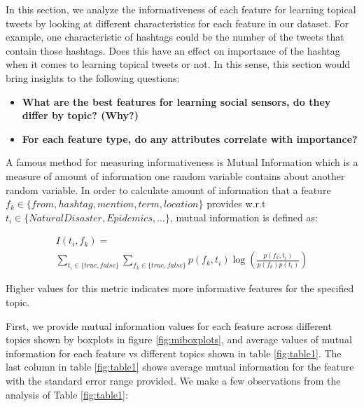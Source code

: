 In this section, we analyze the informativeness of each feature for learning topical tweets by looking at different characteristics for each feature in our dataset. For example, one characteristic of hashtags could be the number of the tweets that contain those hashtags. Does this have an effect on importance of the hashtag when it comes to learning topical tweets or not. In this sense, this section would bring insights to the following questions:

\begin{itemize}
\item \textbf{What are the best features for learning social sensors, do they differ by topic?  (Why?)}
\item \textbf{For each feature type, do any attributes correlate with importance?}
\end{itemize}

A famous method for measuring informativeness is Mutual Information which is a measure of amount of information one random variable contains about another random variable. In order to calculate amount of information that a feature $f_k \in \{from, hashtag, mention, term, location\}$ provides w.r.t $t_i \in \{NaturalDisaster, Epidemics, ...\}$, mutual information is defined as:

\begin{multline}
I(t_i, f_k)= \\
 \sum_{t_i\in \{ true, false \}} \sum_{f_k\in \{ true, false\}}p(f_k,t_i)\log \left ( \frac{p(f_k,t_i)}{p(f_k)p(t_i)} \right )
 \label{eq:eq1}
\end{multline}

Higher values for this metric indicates more informative features for the specified topic.

First, we provide mutual information values for each feature across different topics shown by boxplots in figure \ref{fig:miboxplots}, and average values of mutual information for each feature vs different topics shown in table \ref{fig:table1}. The last column in table \ref{fig:table1} shows average mutual information for the feature with the standard error range provided. We make a few observations from the analysis of Table \ref{fig:table1}:

